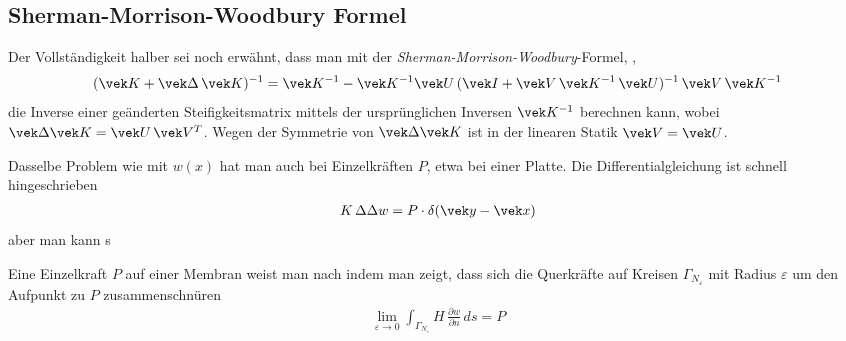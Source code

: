 {{{\textcolor{blau2}{\section{Sherman-Morrison-Woodbury Formel}}\label{Korrektur14}
Der Vollst\"{a}ndigkeit halber sei noch erw\"{a}hnt, dass man mit der {\em Sherman-Morrison-Woodbury\/}-Formel, \cite{Golub},
\begin{align}
(\vek K + \vek \Delta\,\vek K)^{-1} = \vek K^{-1} - \vek K^{-1} \vek U\,(\vek I + \vek V\,\vek K^{-1}\,\vek U)^{-1} \,\vek V\,\vek K^{-1}
\end{align}
die Inverse einer ge\"{a}nderten Steifigkeitsmatrix mittels der urspr\"{u}nglichen Inversen $\vek K^{-1}$ berechnen kann, wobei $\vek \Delta \vek K = \vek U\,\vek V^T$. Wegen der Symmetrie von $\vek \Delta \vek K$ ist in der linearen Statik $\vek V = \vek U$.

\begin{remark}
Dasselbe Problem wie mit $w(x)$ hat man auch bei Einzelkr\"{a}ften $P$, etwa bei einer Platte. Die Differentialgleichung ist schnell hingeschrieben
\begin{align}
K\,\Delta \Delta w = P \cdot \delta(\vek y - \vek x)
\end{align}
aber man kann s
\end{remark}

Eine Einzelkraft $P$ auf einer Membran weist man nach indem man zeigt, dass sich die Querkr\"{a}fte auf Kreisen $\Gamma_{N_\varepsilon}$ mit Radius $\varepsilon$ um den Aufpunkt zu $P$ zusammenschn\"{u}ren
\begin{align}
\lim_{\varepsilon \to 0} \int_{\Gamma_{N_\varepsilon}} H\,\frac{\partial w}{\partial n}\,ds = P
\end{align}


}}}
